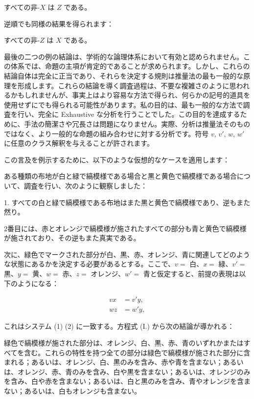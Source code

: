 \documentclass[a4paper,11pt,openany]{ltjsbook}
\begin{document}
\begin{center}
  すべての非-$X$ は $Z$ である。
\end{center}

逆順でも同様の結果を得られます：

\begin{center}
  すべての非-$Z$ は $X$ である。
\end{center}

最後の二つの例の結論は、学術的な論理体系において有効と認められません。この体系では、命題の主項が肯定的であることが求められます。しかし、これらの結論自体は完全に正当であり、それらを決定する規則は推量法の最も一般的な原理を形成します。これらの結論を導く調査過程は、不要な複雑さのように思われるかもしれませんが、事実上はより容易な方法で得られ、何らかの記号的道具を使用せずにでも得られる可能性があります。私の目的は、最も一般的な方法で調査を行い、完全に Exhaustive な分析を行うことでした。この目的を達成するために、手法の簡潔さや冗長さは問題になりません。実際、分析は推量法そのものではなく、より一般的な命題の組み合わせに対する分析です。符号 $v$, $v'$, $w$, $w'$ に任意のクラス解釈を与えることが許されます。

この言及を例示するために、以下のような仮想的なケースを適用します：

ある種類の布地が白と緑で縞模様である場合と黒と黄色で縞模様である場合について、調査を行い、次のように観察しました：

1. すべての白と緑で縞模様である布地はまた黒と黄色で縞模様であり、逆もまた然り。

2番目には、赤とオレンジで縞模様が施されたすべての部分も青と黄色で縞模様が施されており、その逆もまた真実である。

次に、緑色でマークされた部分が白、黒、赤、オレンジ、青に関連してどのような状態にあるかを決定する必要があるとする。ここで、$v=$ 白、$x =$ 緑、$v' =$ 黒、$y =$ 黄、$w =$ 赤、$z =$ オレンジ、$w' =$ 青と仮定すると、前提の表現は以下のようになる：

\begin{align*}
  vx &= v'y,   \\
  wz &= w'y,
\end{align*}

これはシステム (1) (2) に一致する。方程式 (I.) から次の結論が導かれる：

緑色で縞模様が施された部分は、オレンジ、白、黒、赤、青のいずれかまたはすべてを含む。これらの特性を持つ全ての部分は緑色で縞模様が施された部分に含まれる；あるいは、オレンジ、白、黒のみを含み、赤や青を含まない；あるいは、オレンジ、赤、青のみを含み、白や黒を含まない；あるいは、オレンジのみを含み、白や赤を含まない；あるいは、白と黒のみを含み、青やオレンジを含まない；あるいは、白もオレンジも含まない。
\end{document}
